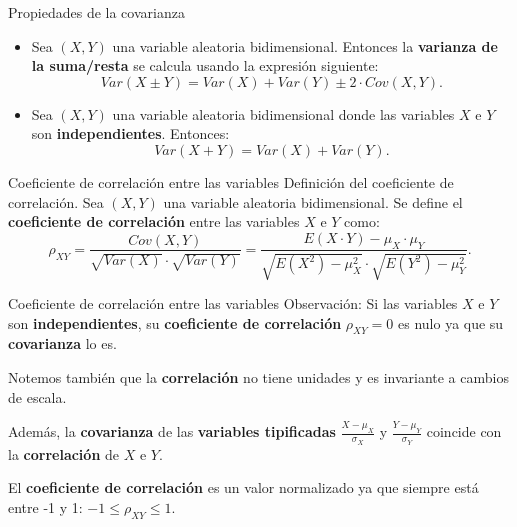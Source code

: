 \documentclass[
  ignorenonframetext,
]{beamer}
\begin{document}
\begin{frame}{Propiedades de la covarianza}
\protect\hypertarget{propiedades-de-la-covarianza}{}
\begin{itemize}
\item
  Sea \((X,Y)\) una variable aleatoria bidimensional. Entonces la
  \textbf{varianza de la suma/resta} se calcula usando la expresión
  siguiente: \[
  Var(X\pm Y)=Var(X)+Var(Y)\pm 2\cdot Cov(X,Y).
  \]
\item
  Sea \((X,Y)\) una variable aleatoria bidimensional donde las variables
  \(X\) e \(Y\) son \textbf{independientes}. Entonces: \[
  Var(X+Y)=Var(X)+Var(Y).
  \]
\end{itemize}
\end{frame}

\begin{frame}{Coeficiente de correlación entre las variables}
\protect\hypertarget{coeficiente-de-correlaciuxf3n-entre-las-variables}{}
Definición del coeficiente de correlación. Sea \((X,Y)\) una variable
aleatoria bidimensional. Se define el \textbf{coeficiente de
correlación} entre las variables \(X\) e \(Y\) como: \[
\rho_{XY}=\frac{Cov(X,Y)}{\sqrt{Var(X)}\cdot\sqrt{Var(Y)}}=\frac{E(X\cdot Y)-\mu_X\cdot \mu_Y}{\sqrt{E\left(X^2\right)-\mu_X^2}\cdot \sqrt{E\left(Y^2\right)-\mu_Y^2}}.
\]
\end{frame}

\begin{frame}{Coeficiente de correlación entre las variables}
\protect\hypertarget{coeficiente-de-correlaciuxf3n-entre-las-variables-1}{}
Observación: Si las variables \(X\) e \(Y\) son \textbf{independientes},
su \textbf{coeficiente de correlación} \(\rho_{XY}=0\) es nulo ya que su
\textbf{covarianza} lo es.

Notemos también que la \textbf{correlación} no tiene unidades y es
invariante a cambios de escala.

Además, la \textbf{covarianza} de las \textbf{variables tipificadas}
\(\frac{X-\mu_X}{\sigma_X}\) y \(\frac{Y-\mu_Y}{\sigma_Y}\) coincide con
la \textbf{correlación} de \(X\) e \(Y\).

El \textbf{coeficiente de correlación} es un valor normalizado ya que
siempre está entre -1 y 1: \(-1\leq\rho_{XY}\leq 1\).
\end{frame}
\end{document}
